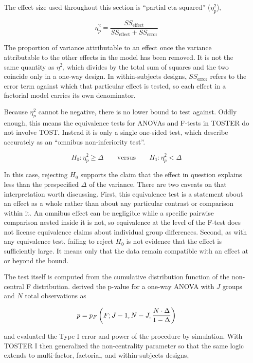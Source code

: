 \documentclass[]{interact}
\theoremstyle{plain}%
\theoremstyle{definition}
\theoremstyle{remark}
\begin{document}
The effect size used throughout this section is ``partial eta-squared''
(\(\eta^2_p\)),

\[
\eta^2_p = \frac{SS_{\text{effect}}}{SS_{\text{effect}} + SS_{\text{error}}}
\]

The proportion of variance attributable to an effect once the variance
attributable to the other effects in the model has been removed. It is
not the same quantity as \(\eta^2\), which divides by the total sum of
squares and the two coincide only in a one-way design. In
within-subjects designs, \(SS_{\text{error}}\) refers to the error term
against which that particular effect is tested, so each effect in a
factorial model carries its own denominator.

Because \(\eta^2_p\) cannot be negative, there is no lower bound to test
against. Oddly enough, this means the equivalence tests for ANOVAs and
F-tests in TOSTER do not involve TOST. Instead it is only a single
one-sided test, which \citet{Campbell_2021} describe accurately as an
``omnibus non-inferiority test''.

\[
H_0: \eta^2_p \geq \Delta \qquad \text{versus} \qquad H_1: \eta^2_p < \Delta
\]

In this case, rejecting \(H_0\) supports the claim that the effect in
question explains less than the prespecified \(\Delta\) of the variance.
There are two caveats on that interpretation worth discussing. First,
this equivalence test is a statement about an effect as a whole rather
than about any particular contrast or comparison within it. An omnibus
effect can be negligible while a specific pairwise comparison nested
inside it is not, so equivalence at the level of the F-test does not
license equivalence claims about individual group differences. Second,
as with any equivalence test, failing to reject \(H_0\) is not evidence
that the effect is sufficiently large. It means only that the data
remain compatible with an effect at or beyond the bound.

The test itself is computed from the cumulative distribution function of
the non-central F distribution. \citet{Campbell_2021} derived the
p-value for a one-way ANOVA with \(J\) groups and \(N\) total
observations as

\[
p = p_F \left( F; \space J-1, \space N-J, \space \frac{N \cdot \Delta}{1 - \Delta} \right)
\]

and evaluated the Type I error and power of the procedure by simulation.
With TOSTER I then generalized the non-centrality parameter so that the
same logic extends to multi-factor, factorial, and within-subjects
designs,
\end{document}

